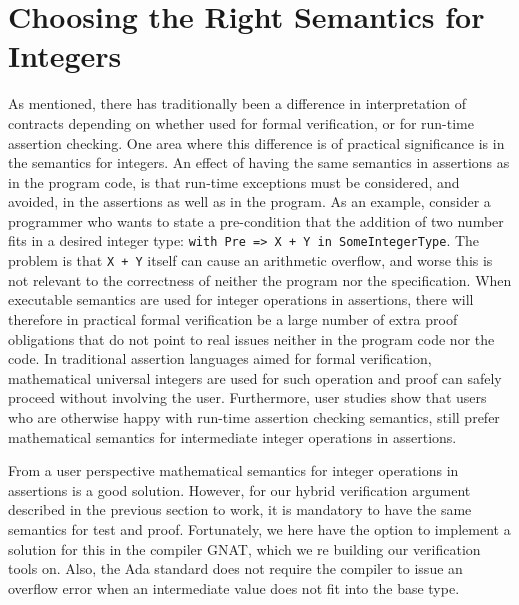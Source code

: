\documentclass[sttt,draft]{svjour}
\begin{document}
\section{Choosing the Right Semantics for Integers}
\label{overflowsemantics}
As mentioned, there has traditionally been a difference in
interpretation of contracts depending on whether used for formal
verification, or for run-time assertion checking. One area where this
difference is of practical significance is in the semantics for
integers. An effect of having the same semantics in assertions as in
the program code, is that run-time exceptions must be considered, and
avoided, in the assertions as well as in the program. As an example,
consider a programmer who wants to state a pre-condition that the
addition of two number fits in a desired integer type:
\verb|with Pre => X + Y in SomeIntegerType|. The problem is that
\verb|X + Y| itself can cause an arithmetic overflow, and worse this
is not relevant to the correctness of neither the program nor the
specification. When executable semantics are used for integer
operations in assertions, there will therefore in practical formal
verification be a large number of extra proof obligations that do not
point to real issues neither in the program code nor the code. In
traditional assertion languages aimed for formal verification,
mathematical universal integers are used for such operation and proof
can safely proceed without involving the user. Furthermore, user
studies \cite{jotChalin04} show that users who are otherwise happy
with run-time assertion checking semantics, still prefer mathematical
semantics for intermediate integer operations in assertions.

From a user perspective mathematical semantics for integer operations
in assertions is a good solution. However, for our hybrid verification
argument described in the previous section to work, it is mandatory to
have the same semantics for test and proof. Fortunately, we here have
the option to implement a solution for this in the compiler GNAT,
which we re building our verification tools on. Also, the Ada standard
does not require the compiler to issue an overflow error when an
intermediate value does not fit into the base type. 
\end{document}
